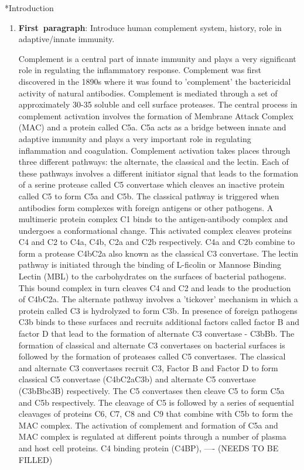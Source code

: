 \documentclass[12pt]{article}
\makeatletter
\renewcommand\section{\@startsection
	{subsection}{2}{0mm}
	{-0.2in}
	{0.05\baselineskip}
	{\normalfont\large\bfseries}}
\makeatother
\begin{document}
\section*{Introduction}
\begin{enumerate}
	\item{\textbf{First~paragraph}: Introduce human complement system, history, role in adaptive/innate immunity. }
	
	Complement is a central part of innate immunity and plays a very significant role in regulating the inflammatory response. Complement was first discovered in the 1890s where it was found to 'complement' the bactericidal activity of natural antibodies. Complement is mediated through a set of approximately 30-35 soluble and cell surface proteases. The central process in complement activation involves the formation of Membrane Attack Complex (MAC) and a protein called C5a. C5a acts as a bridge between innate and adaptive immunity and plays a very important role in regulating inflammation and coagulation.  Complement activation takes places through three different pathways: the alternate, the classical and the lectin. Each of these pathways involves a different initiator signal that leads to the formation of a serine protease called C5 convertase which cleaves an inactive protein called C5 to form C5a and C5b. The classical pathway is triggered when antibodies form complexes with foreign antigens or other pathogens. A multimeric protein complex C1 binds to the antigen-antibody complex and undergoes a conformational change. This activated complex cleaves proteins C4 and C2 to C4a, C4b, C2a and C2b respectively. C4a and C2b combine to form a protease C4bC2a also known as the classical C3 convertase. The lectin pathway is initiated through the binding of L-ficolin or Mannose Binding Lectin (MBL) to the carbohydrates on the surfaces of bacterial pathogens. This bound complex in turn cleaves C4 and C2 and leads to the production of C4bC2a. The alternate pathway involves a 'tickover' mechanism in which a protein called C3 is hydrolyzed to form C3b. In presence of foreign pathogens C3b binds to these surfaces and recruits  additional factors called factor B and factor D that lead to the formation of alternate C3 convertase - C3bBb. The formation of classical and alternate C3 convertases on bacterial surfaces is followed by the formation of proteases called C5 convertases. The classical and alternate C3 convertases recruit C3, Factor B and Factor D to form classical C5 convertase (C4bC2aC3b) and alternate C5 convertase (C3bBbc3B) respectively. The C5 convertases then cleave C5 to form C5a and C5b respectively. 	The cleavage of C5 is followed by a series of sequential cleavages of proteins C6, C7, C8 and C9 that combine with C5b to form the MAC complex.  The activation of complement and formation of C5a and MAC complex is regulated at different points through a number of plasma and host cell proteins.  C4 binding protein (C4BP), ---- (NEEDS TO BE FILLED)
	

\end{enumerate}
\end{document}
